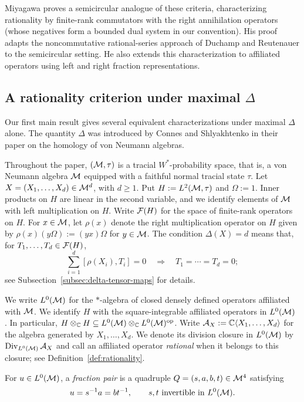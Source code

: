 Miyagawa \cite[Theorems 3.1 and 4.5]{Miy22} proves a semicircular analogue of these criteria, characterizing rationality by finite-rank commutators with the right annihilation operators (whose negatives form a bounded dual system in our convention).
His proof adapts the noncommutative rational-series approach of Duchamp and Reutenauer to the semicircular setting.
He also extends this characterization to affiliated operators using left and right fraction representations.

\subsection{A rationality criterion under maximal \texorpdfstring{$\Delta$}{Delta}}
Our first main result gives several equivalent characterizations under maximal $\Delta$ alone.
The quantity $\Delta$ was introduced by Connes and Shlyakhtenko in their paper \cite{CS05} on the homology of von Neumann algebras.

Throughout the paper, $(\mathcal M,\tau)$ is a tracial $W^*$-probability space, that is, a von Neumann algebra $\mathcal M$ equipped with a faithful normal tracial state $\tau$.
Let $X=(X_1,\ldots,X_d)\in\mathcal M^d$, with $d\geq1$.
Put $H:=L^2(\mathcal M,\tau)$ and $\Omega:=1$.
Inner products on $H$ are linear in the second variable, and we identify elements of $\mathcal M$ with left multiplication on $H$.
Write $\mathcal F(H)$ for the space of finite-rank operators on $H$.
For $x\in\mathcal M$, let $\rho(x)$ denote the right multiplication operator on $H$ given by $\rho(x)(y\Omega):=(yx)\Omega$ for $y\in\mathcal M$.
The condition $\Delta(X)=d$ means that, for $T_1,\ldots,T_d\in\mathcal F(H)$,
\[
 \sum_{i=1}^d[\rho(X_i),T_i]=0
 \quad\Longrightarrow\quad T_1=\cdots=T_d=0;
\]
see Subsection~\ref{subsec:delta-tensor-maps} for details.

We write $L^0(\mathcal M)$ for the $*$-algebra of closed densely defined operators affiliated with $\mathcal M$.
We identify $H$ with the square-integrable affiliated operators in $L^0(\mathcal M)$ \cite[Theorem~7.3.2]{AP18}.
In particular, $H\otimes_{\mathbb C}H\subseteq L^0(\mathcal M)\otimes_{\mathbb C}L^0(\mathcal M)^{\mathrm{op}}$.
Write $\mathcal A_X:=\mathbb C\langle X_1,\ldots,X_d\rangle$ for the algebra generated by $X_1,\ldots,X_d$.
We denote its division closure in $L^0(\mathcal M)$ by $\operatorname{Div}_{L^0(\mathcal M)}\mathcal A_X$ and call an affiliated operator \emph{rational} when it belongs to this closure; see Definition~\ref{def:rationality}.

\begin{definition}\label{def:fraction-pair}
For $u\in L^0(\mathcal M)$, a \emph{fraction pair} is a quadruple $Q=(s,a,b,t)\in\mathcal M^4$ satisfying
\begin{equation}
 u=s^{-1}a=bt^{-1},\qquad s,t\text{ invertible in }L^0(\mathcal M).
 \label{eq:fractions}
\end{equation}
\end{definition}


